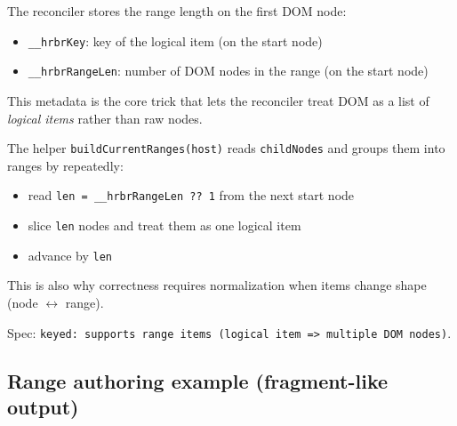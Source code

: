 The reconciler stores the range length on the first DOM node:

\begin{itemize}
  \item \texttt{\_\_hrbrKey}: key of the logical item (on the start node)
  \item \texttt{\_\_hrbrRangeLen}: number of DOM nodes in the range (on the start node)
\end{itemize}

This metadata is the core trick that lets the reconciler treat DOM as a list of \emph{logical items} rather than raw nodes.

\begin{center}
\end{center}
The helper \texttt{buildCurrentRanges(host)} reads \texttt{childNodes} and groups them into ranges by repeatedly:

\begin{itemize}
  \item read \texttt{len = \_\_hrbrRangeLen ?? 1} from the next start node
  \item slice \texttt{len} nodes and treat them as one logical item
  \item advance by \texttt{len}
\end{itemize}

This is also why correctness requires normalization when items change shape (node \(\leftrightarrow\) range).

Spec: \texttt{keyed: supports range items (logical item => multiple DOM nodes)}.

\subsection{Range authoring example (fragment-like output)}

